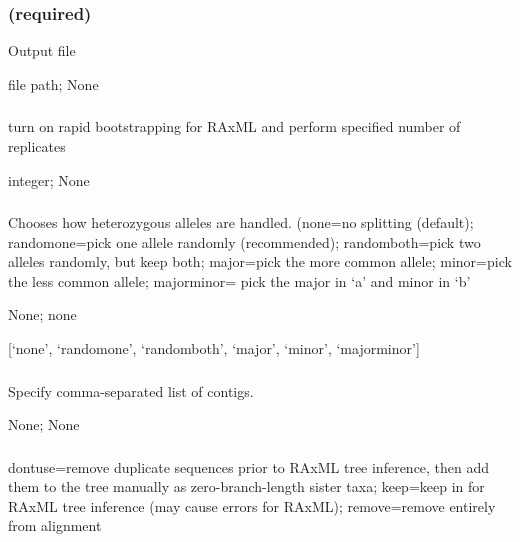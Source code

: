 \documentclass[letterpaper,11pt,english]{sphinxmanual}
\begin{document}
\subsubsection{ (required)}
\label{\detokenize{prog_desc:id113}}
 Output file

 file path;  None


\subsubsection{}
\label{\detokenize{prog_desc:bootstrap}}
 turn on rapid bootstrapping for RAxML and perform specified number of replicates

 integer;  None


\subsubsection{}
\label{\detokenize{prog_desc:choose-allele-chooseallele-hapmode}}
 Chooses how heterozygous alleles are handled. (none=no splitting (default); randomone=pick one allele randomly (recommended); randomboth=pick two alleles randomly, but keep both; major=pick the more common allele; minor=pick the less common allele; majorminor= pick the major in ‘a’ and minor in ‘b’

 None;  none

 {[}‘none’, ‘randomone’, ‘randomboth’, ‘major’, ‘minor’, ‘majorminor’{]}


\subsubsection{}
\label{\detokenize{prog_desc:id114}}
 Specify comma-separated list of contigs.

 None;  None


\subsubsection{}
\label{\detokenize{prog_desc:duplicate-seq-duplicateseq}}
 dontuse=remove duplicate sequences prior to RAxML tree inference, then add them to the tree manually as zero-branch-length sister taxa; keep=keep in for RAxML tree inference (may cause errors for RAxML); remove=remove entirely from alignment
\end{document}
